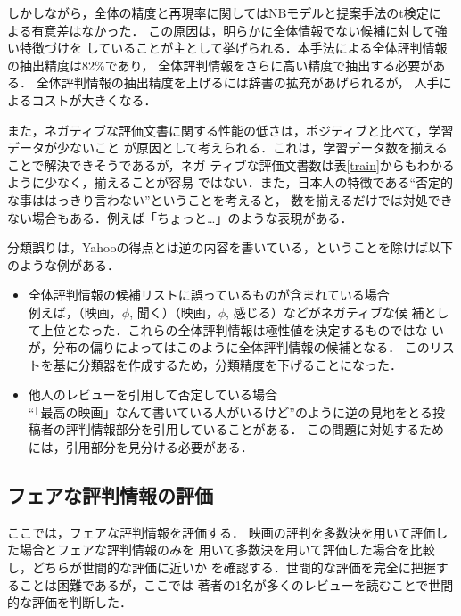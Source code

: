 \documentclass[japanese]{jnlp_1.3c}
\begin{document}
しかしながら，全体の精度と再現率に関してはNBモデルと提案手法のt検定に
よる有意差はなかった．
この原因は，明らかに全体情報でない候補に対して強い特徴づけを
していることが主として挙げられる．本手法による全体評判情報の抽出精度は82\%であり，
全体評判情報をさらに高い精度で抽出する必要がある．
全体評判情報の抽出精度を上げるには辞書の拡充があげられるが，
人手によるコストが大きくなる．

また，ネガティブな評価文書に関する性能の低さは，ポジティブと比べて，学習データが少ないこと
が原因として考えられる．これは，学習データ数を揃えることで解決できそうであるが，ネガ
ティブな評価文書数は表\ref{train}からもわかるように少なく，揃えることが容易
ではない．また，日本人の特徴である“否定的な事ははっきり言わない”ということを考えると，
数を揃えるだけでは対処できない場合もある．例えば「ちょっと…」のような表現がある．

分類誤りは，Yahooの得点とは逆の内容を書いている，ということを除けば以下のような例がある．
\begin{itemize}
\item  全体評判情報の候補リストに誤っているものが含まれている場合\\
例えば，（映画，$\phi$, 聞く）（映画，$\phi$, 感じる）などがネガティブな候
補として上位となった．これらの全体評判情報は極性値を決定するものではな
いが，分布の偏りによってはこのように全体評判情報の候補となる．
このリストを基に分類器を作成するため，分類精度を下げることになった．
\item 他人のレビューを引用して否定している場合\\
``「最高の映画」なんて書いている人がいるけど''のように逆の見地をとる投
稿者の評判情報部分を引用していることがある．
この問題に対処するためには，引用部分を見分ける必要がある．
\end{itemize}


\subsection{フェアな評判情報の評価}
ここでは，フェアな評判情報を評価する．
映画の評判を多数決を用いて評価した場合とフェアな評判情報のみを
用いて多数決を用いて評価した場合を比較し，どちらが世間的な評価に近いか
を確認する．世間的な評価を完全に把握することは困難であるが，ここでは
著者の1名が多くのレビューを読むことで世間的な評価を判断した．
\end{document}

